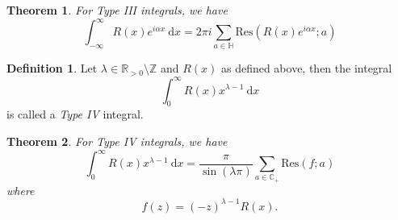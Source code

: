 \documentclass[letterpaper,12pt]{article}
\theoremstyle{definition}
\newtheorem{definition}{Definition}[section]
\theoremstyle{plain}
\newtheorem{thm}{Theorem}[section]
\theoremstyle{remark}
\newcommand{\R}{\mathbb{R}}
\newcommand{\C}{\mathbb{C}}
\begin{document}
\begin{thm}
For Type III integrals, we have
\[\int_{-\infty}^{\infty} R(x)e^{i\alpha x} \ \mathrm{d}x =  2\pi i \sum_{a\in \mathbb{H}}\mathrm{Res}(R(x)e^{i\alpha x}; a)\]
\end{thm}

\begin{definition}
Let $\lambda\in\R_{>0}\setminus \mathbb{Z}$ and $R(x)$ as defined above, then the integral
\[\int_0^\infty R(x)x^{\lambda-1}\ \mathrm{d}x\]
is called a \emph{Type IV} integral.
\end{definition}

\begin{thm}
For Type IV integrals, we have
\[\int_0^\infty R(x)x^{\lambda-1}\ \mathrm{d}x = \frac{\pi}{\sin(\lambda\pi)} \sum_{a\in \C_+}\mathrm{Res}(f;a)\]
where
\[f(z) = (-z)^{\lambda-1}R(x).\]
\end{thm}
\end{document}
